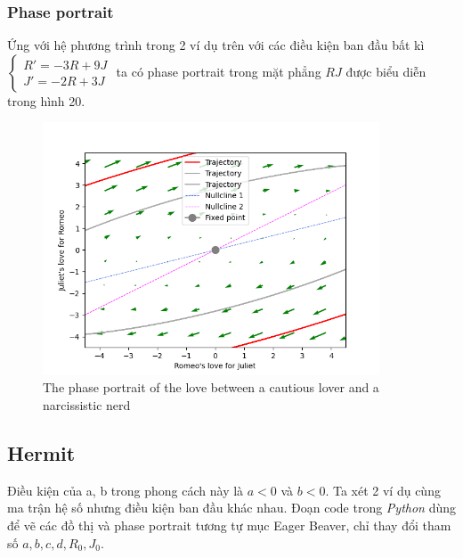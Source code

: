 \subsubsection{Phase portrait}
Ứng với hệ phương trình trong 2 ví dụ trên với các điều kiện ban đầu bất kì
$\begin{cases}
        R'=-3R+9J\\
        J'=-2R+3J
\end{cases}$
ta có phase portrait trong mặt phẳng $RJ$ được biểu diễn trong hình 20.
\begin{figure}[h!]
    \begin{center}
    \includegraphics[width=10cm]{images/phase_portrait_cautious_lover.png}
    \end{center}
    \caption{The phase portrait of the love between a cautious lover and a narcissistic nerd}
\end{figure}
\subsection{Hermit}
Điều kiện của a, b trong phong cách này là $a < 0$ và $b < 0$. Ta xét 2 ví dụ cùng ma trận hệ số nhưng điều kiện ban đầu khác nhau. Đoạn code trong \textit{Python} dùng để vẽ các đồ thị và phase portrait tương tự mục Eager Beaver, chỉ thay đổi tham số $a, b, c, d, R_0, J_0$.
